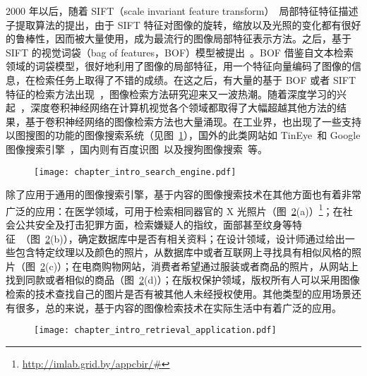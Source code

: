 2000 年以后，随着 SIFT（scale invariant feature transform）~\cite{Lowe2004DistinctiveIF}局部特征特征描述子提取算法的提出，由于 SIFT 特征对图像的旋转，缩放以及光照的变化都有很好的鲁棒性，因而被大量使用，成为最流行的图像局部特征表示方法。之后，基于 SIFT 的视觉词袋（bag of features，BOF）模型被提出~\cite{Sivic2003VideoGA}。BOF 借鉴自文本检索领域的词袋模型，很好地利用了图像的局部特征，用一个特征向量编码了图像的信息，在检索任务上取得了不错的成绩。在这之后，有大量的基于 BOF 或者 SIFT 特征的检索方法出现~\cite{Philbin2008LostIQ,Philbin2007ObjectRW,Mikulk2010LearningAF,Arandjelovic2012ThreeTE,Chum2007TotalRA}，图像检索方法研究迎来又一波热潮。随着深度学习的兴起~\cite{Krizhevsky2012ImageNetCW}，深度卷积神经网络在计算机视觉各个领域都取得了大幅超越其他方法的结果，基于卷积神经网络的图像检索方法也大量涌现。在工业界，也出现了一些支持以图搜图的功能的图像搜索系统（见图~\ref{fig:image_search_engine}），国外的此类网站如 TinEye~\cite{tineyeImgSearch}和 Google 图像搜索引擎~\cite{googleImgSearch}，国内则有百度识图~\cite{baiduImgSearch}以及搜狗图像搜索~\cite{sougouImgSearch}等。

\begin{figure}[t]
\centering
\texttt{[image: chapter\_intro\_search\_engine.pdf]}
\label{fig:image_search_engine}
\end{figure}

除了应用于通用的图像搜索引擎，基于内容的图像搜索技术在其他方面也有着非常广泛的应用：在医学领域，可用于检索相同器官的 X 光照片（图~\ref{fig:image_retrieval_application}(a)）\footnote{\url{http://imlab.grid.by/appcbir/#}}；在社会公共安全及打击犯罪方面，检索嫌疑人的指纹，面部甚至纹身等特征~\cite{Lee2012ImageRI}（图~\ref{fig:image_retrieval_application}(b)），确定数据库中是否有相关资料；在设计领域，设计师通过给出一些包含特定纹理以及颜色的照片，从数据库中或者互联网上寻找具有相似风格的照片（图~\ref{fig:image_retrieval_application}(c)）；在电商购物网站，消费者希望通过服装或者商品的照片，从网站上找到同款或者相似的商品（图~\ref{fig:image_retrieval_application}(d)）；在版权保护领域，版权所有人可以采用图像检索的技术查找自己的图片是否有被其他人未经授权使用。其他类型的应用场景还有很多，总的来说，基于内容的图像检索技术在实际生活中有着广泛的应用。

\begin{figure}[t]
\centering
\texttt{[image: chapter\_intro\_retrieval\_application.pdf]}
\label{fig:image_retrieval_application}
\end{figure}

